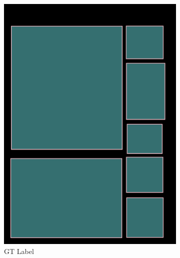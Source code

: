 \documentclass[aspectratio=1610]{beamer}
\begin{document}
\begin{frame}
\begin{figure}
\begin{subfigure}{.25\textwidth}
  \includegraphics[width=0.99\linewidth, clip=true, trim = 0mm 0mm 0mm 0mm]{figures/bbox/AVThDFz.jpg}
  \caption{GT Label}
\end{subfigure}%
\begin{subfigure}{.25\textwidth}
  \centering

\end{subfigure}
\end{figure}
\end{frame}
\end{document}
